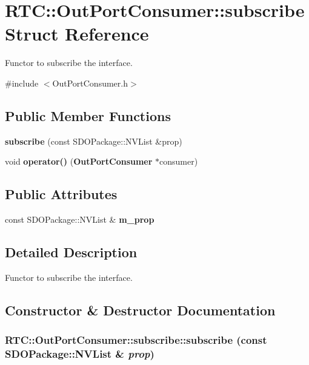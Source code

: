 \section{RTC::OutPortConsumer::subscribe Struct Reference}
\label{structRTC_1_1OutPortConsumer_1_1subscribe}


Functor to subscribe the interface.  




{\ttfamily \#include $<$OutPortConsumer.h$>$}

\subsection*{Public Member Functions}
\begin{DoxyCompactItemize}
\item 
{\bf subscribe} (const SDOPackage::NVList \&prop)
\item 
void {\bf operator()} ({\bf OutPortConsumer} $\ast$consumer)
\end{DoxyCompactItemize}
\subsection*{Public Attributes}
\begin{DoxyCompactItemize}
\item 
const SDOPackage::NVList \& {\bf m\_\-prop}
\end{DoxyCompactItemize}


\subsection{Detailed Description}
Functor to subscribe the interface. 

\subsection{Constructor \& Destructor Documentation}
\subsubsection[{subscribe}]{\setlength{\rightskip}{0pt plus 5cm}RTC::OutPortConsumer::subscribe::subscribe (const SDOPackage::NVList \& {\em prop})\hspace{0.3cm}{\ttfamily  [inline]}}\label{structRTC_1_1OutPortConsumer_1_1subscribe_a4bbbb148a1ac4e57872f0a26e983434f}


